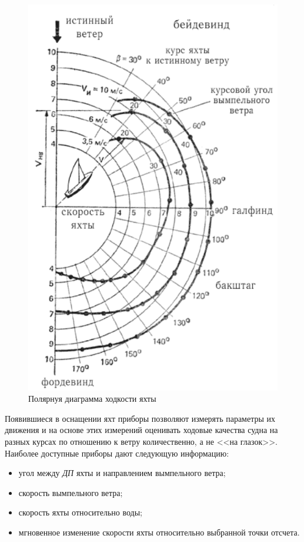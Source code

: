 \documentclass[a4paper, 12pt, twoside, final, book, russian, fittopage, cyremdash]{ncc}
\begin{document}
\begin{figure}[hbt]
  \centering
  \includegraphics{0031}
  \caption{Полярнуя диаграмма ходкости яхты}
  \label{fig:31}
\end{figure}

Появившиеся в оснащении яхт приборы позволяют измерять параметры их движения и на основе этих измерений оценивать ходовые качества судна на разных курсах по отношению к ветру количественно, а не <<на глазок>>. Наиболее доступные приборы дают следующую информацию:

\begin{itemize}
\item угол между \textit{ДП} яхты и направлением вымпельного ветра; 
\item скорость вымпельного ветра; 
\item скорость яхты относительно воды; 
\item мгновенное изменение скорости яхты относительно выбранной точки отсчета. 
\end{itemize}
\end{document}
